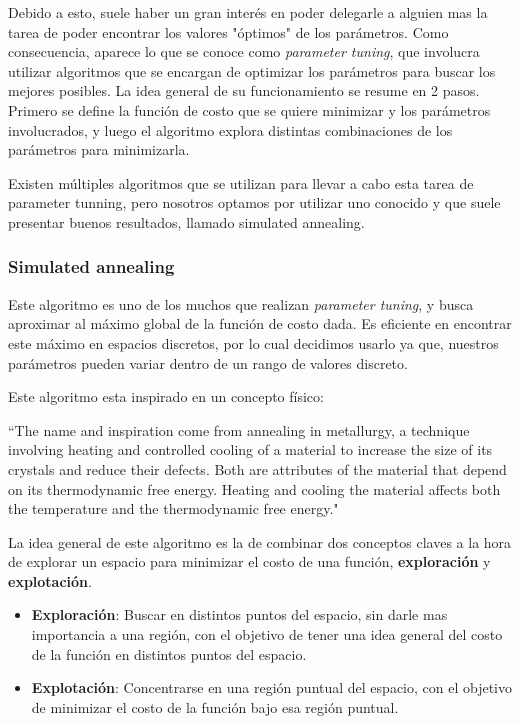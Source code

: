 \documentclass[a4paper]{article}
\begin{document}
    Debido a esto, suele haber un gran interés en poder delegarle a alguien mas la tarea de poder encontrar los valores "óptimos" de los parámetros. Como consecuencia, aparece lo que se conoce como \textit{parameter tuning}, que involucra utilizar algoritmos que se encargan de optimizar los parámetros para buscar los mejores posibles. La idea general de su funcionamiento se resume en 2 pasos. Primero se define la función de costo que se quiere minimizar y los parámetros involucrados, y luego el algoritmo explora distintas combinaciones de los parámetros para minimizarla.
    
    Existen múltiples algoritmos que se utilizan para llevar a cabo esta tarea de parameter tunning, pero nosotros optamos por utilizar uno conocido y que suele presentar buenos resultados, llamado simulated annealing.
        
        \subsubsection{Simulated annealing}
        Este algoritmo es uno de los muchos que realizan \textit{parameter tuning}, y busca aproximar al máximo global de la función de costo dada. Es eficiente en encontrar este máximo en espacios discretos, por lo cual decidimos usarlo ya que, nuestros parámetros pueden variar dentro de un rango de valores discreto. 
        
        Este algoritmo esta inspirado en un concepto físico:
        \begin{displayquote}
            ``The name and inspiration come from annealing in metallurgy, a technique involving heating and controlled cooling of a material to increase the size of its crystals and reduce their defects. Both are attributes of the material that depend on its thermodynamic free energy. Heating and cooling the material affects both the temperature and the thermodynamic free energy."
        \end{displayquote}
        
        La idea general de este algoritmo es la de combinar dos conceptos claves a la hora de explorar un espacio para minimizar el costo de una función, \textbf{exploración} y \textbf{explotación}.
        
        \begin{itemize}
            \item \textbf{Exploración}: Buscar en distintos puntos del espacio, sin darle mas importancia a una región, con el objetivo de tener una idea general del costo de la función en distintos puntos del espacio.
            
            \item \textbf{Explotación}: Concentrarse en una región puntual del espacio, con el objetivo de minimizar el costo de la función bajo esa región puntual.
        \end{itemize}
        
\end{document}
